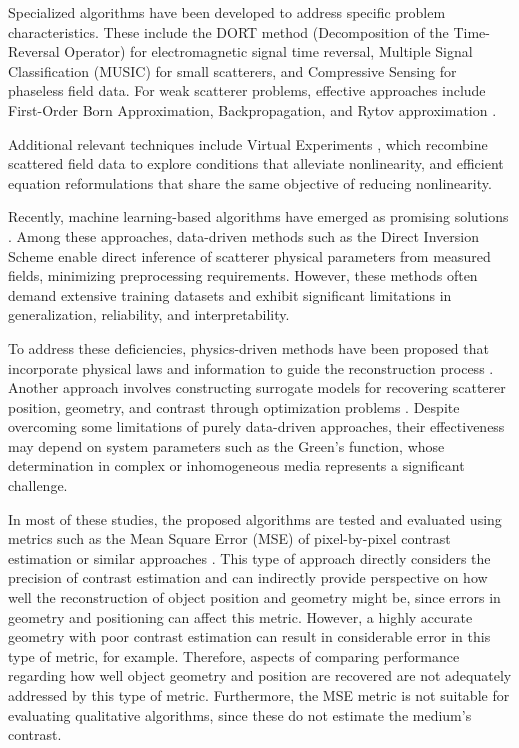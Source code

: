 \documentclass{ieeeaccess}
\begin{document}
    Specialized algorithms have been developed to address specific problem characteristics. These include the DORT method (Decomposition of the Time-Reversal Operator) \cite{chen2018computational} for electromagnetic signal time reversal, Multiple Signal Classification (MUSIC) \cite{zhong2007music} for small scatterers, and Compressive Sensing \cite{massa2015compressive} for phaseless field data. For weak scatterer problems, effective approaches include First-Order Born Approximation, Backpropagation, and Rytov approximation \cite{chen2018computational}. 

    Additional relevant techniques include Virtual Experiments \cite{isernia2024some,bevacqua2021simple}, which recombine scattered field data to explore conditions that alleviate nonlinearity, and efficient equation reformulations \cite{isernia2024some,bevacqua2021effective} that share the same objective of reducing nonlinearity.

    Recently, machine learning-based algorithms have emerged as promising solutions \cite{chen2020review}. Among these approaches, data-driven methods such as the Direct Inversion Scheme \cite{yao2020enhanced,wei2019solving} enable direct inference of scatterer physical parameters from measured fields, minimizing preprocessing requirements. However, these methods often demand extensive training datasets and exhibit significant limitations in generalization, reliability, and interpretability. 

    To address these deficiencies, physics-driven methods have been proposed that incorporate physical laws and information to guide the reconstruction process \cite{wei2019physics,wang2023push,hu2023more,liu2025exploring}. Another approach involves constructing surrogate models for recovering scatterer position, geometry, and contrast through optimization problems \cite{salucci2022learned,zardi2025physics}. Despite overcoming some limitations of purely data-driven approaches, their effectiveness may depend on system parameters such as the Green's function, whose determination in complex or inhomogeneous media represents a significant challenge.

    In most of these studies, the proposed algorithms are tested and evaluated using metrics such as the Mean Square Error (MSE) of pixel-by-pixel contrast estimation or similar approaches \cite{yin2023subspace,zhang2023iterative,salucci2022learned,wang2023push,liu2022som,bevacqua2021simple,bevacqua2021effective}. This type of approach directly considers the precision of contrast estimation and can indirectly provide perspective on how well the reconstruction of object position and geometry might be, since errors in geometry and positioning can affect this metric. However, a highly accurate geometry with poor contrast estimation can result in considerable error in this type of metric, for example. Therefore, aspects of comparing performance regarding how well object geometry and position are recovered are not adequately addressed by this type of metric. Furthermore, the MSE metric is not suitable for evaluating qualitative algorithms, since these do not estimate the medium's contrast.
\end{document}
